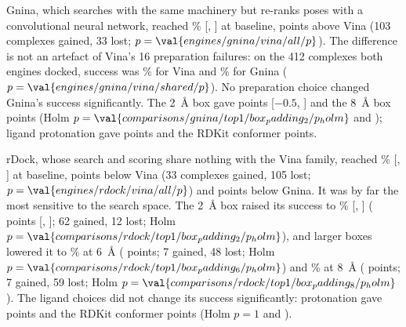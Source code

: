 Gnina, which searches with the same machinery but re-ranks poses with a convolutional
neural network, reached \% [, ] at baseline,  points above Vina (103
complexes gained, 33 lost; $p = \val{engines/gnina/vina/all/p}$). The difference is not an artefact of
Vina's 16 preparation failures: on the 412 complexes both engines docked, success was
\% for Vina and \% for Gnina ($p = \val{engines/gnina/vina/shared/p}$). No preparation choice
changed Gnina's success significantly. The \SI{2}{\angstrom} box gave  points [$-0.5$, ] and the
\SI{8}{\angstrom} box  points (Holm $p = \val{comparisons/gnina/top1/box_padding_2/p_holm}$ and ); ligand protonation gave
 points and the RDKit conformer  points.

rDock, whose search and scoring share nothing with the Vina family, reached \% [,
] at baseline,  points below Vina (33 complexes gained, 105 lost;
$p = \val{engines/rdock/vina/all/p}$) and  points below Gnina. It was by far the most sensitive to
the search space. The \SI{2}{\angstrom} box raised its success to \% [, ]
( points [, ]; 62 gained, 12 lost; Holm $p = \val{comparisons/rdock/top1/box_padding_2/p_holm}$), and larger boxes lowered
it to \% at \SI{6}{\angstrom} ( points; 7 gained, 48 lost; Holm
$p = \val{comparisons/rdock/top1/box_padding_6/p_holm}$) and \% at \SI{8}{\angstrom} ( points; 7 gained, 59
lost; Holm $p = \val{comparisons/rdock/top1/box_padding_8/p_holm}$). The ligand choices did not change its success
significantly: protonation gave  points and the RDKit conformer  points (Holm
$p = 1$ and ).

